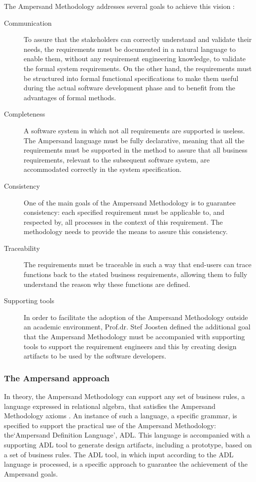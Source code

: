 The Ampersand Methodology addresses several goals to achieve this vision :
\begin{description}
	\item[Communication]  To assure that the stakeholders can correctly understand and validate their needs, the requirements must be documented in a natural language to enable them, without any requirement engineering knowledge, to validate the formal system requirements. On the other hand, the requirements must be structured into formal  functional specifications to make them useful during the actual software development phase and to benefit from the advantages of formal methods. 
	\item[Completeness]A software system in which not all requirements are supported is useless. The Ampersand language must be fully declarative, meaning that all the requirements must be supported in the method to assure that all business requirements, relevant to the subsequent software system, are accommodated correctly in the system specification.
	\item[Consistency]One of the main goals of the Ampersand Methodology is to guarantee consistency: each specified requirement must be applicable to, and respected by, all processes in the context of this requirement. The methodology needs to provide the means to assure this consistency.
	\item[Traceability] The requirements must be traceable in such a way that end-users can trace  functions back to the stated business requirements, allowing them to fully understand the reason why these functions are defined.
	\item[Supporting tools] In order to facilitate the adoption of the Ampersand Methodology outside an academic environment, Prof.dr. Stef Joosten defined the additional goal that the Ampersand Methodology must be accompanied with supporting tools to support the requirement engineers and this by creating design artifacts to be used by the software developers.
\end{description}

\subsubsection{The Ampersand approach}
In theory, the Ampersand Methodology can support any set of business rules, a language expressed in relational algebra, that satisfies the Ampersand Methodology axioms . 
An instance of such a language, a specific grammar, is specified to support the practical use of the Ampersand Methodology: the`Ampersand Definition Language', ADL.
This language is accompanied with a supporting ADL tool to generate design artifacts, including a prototype, based on a set of business rules.
The ADL tool, in which input according to the ADL language is processed, is a specific approach to guarantee the achievement of the Ampersand goals.

